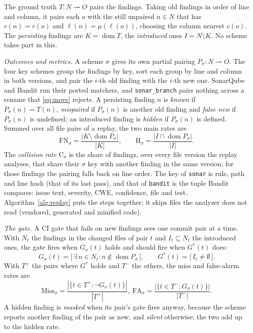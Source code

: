 \documentclass[conference]{IEEEtran}
\begin{document}
The ground truth $T\colon N \rightharpoonup O$ pairs the findings. Taking old findings in
order of line and column, it pairs each $o$ with the still unpaired $n \in N$ that has
$r(n) = r(o)$ and $\ell(n) = \mu(\ell(o))$, choosing the column nearest $c(o)$. The
\emph{persisting} findings are $K = \operatorname{dom} T$, the \emph{introduced} ones
$I = N \setminus K$. No scheme takes part in this.

\textit{Outcomes and metrics.} A scheme $\sigma$ gives its own partial pairing
$P_\sigma\colon N \rightharpoonup O$. The four key schemes group the findings by key,
sort each group by line and column in both versions, and pair the $i$-th old finding with
the $i$-th new one. SonarQube and Bandit run their ported matchers, and
\texttt{sonar\_branch} pairs nothing across a rename that \eqref{eq:move} rejects. A
persisting finding $n$ is \emph{known} if $P_\sigma(n) = T(n)$, \emph{mispaired} if
$P_\sigma(n)$ is another old finding and \emph{false new} if $P_\sigma(n)$ is undefined;
an introduced finding is \emph{hidden} if $P_\sigma(n)$ is defined. Summed over all file
pairs of a replay, the two main rates are
\begin{equation}\label{eq:rates}
\mathrm{FN}_\sigma = \frac{|K \setminus \operatorname{dom} P_\sigma|}{|K|},
\qquad
\mathrm{H}_\sigma = \frac{|I \cap \operatorname{dom} P_\sigma|}{|I|}.
\end{equation}
The \emph{collision rate} $\mathrm{C}_\sigma$ is the share of findings, over every file
version the replay analyses, that share their $\sigma$ key with another finding in the
same version; for those findings the pairing falls back on line order. The key of
\texttt{sonar} is rule, path and line hash (that of its last pass), and that of
\texttt{bandit} is the tuple Bandit compares: issue text, severity, CWE, confidence,
file and test. Algorithm~\ref{alg:replay} puts the steps together; it skips files the
analyzer does not read (vendored, generated and minified code).

\textit{The gate.} A CI gate that fails on new findings sees one commit pair at a time.
With $N_t$ the findings in the changed files of pair $t$ and $I_t \subseteq N_t$ the
introduced ones, the gate fires when $G_\sigma(t)$ holds and should fire when $G^*(t)$
does:
\begin{equation}\label{eq:gate}
G_\sigma(t) = \bigl[\, \exists\, n \in N_t : n \notin \operatorname{dom} P_\sigma \,\bigr],
\qquad
G^{*}(t) = \bigl[\, I_t \neq \emptyset \,\bigr].
\end{equation}
With $T^{+}$ the pairs where $G^{*}$ holds and $T^{-}$ the others, the miss and
false-alarm rates are
\begin{equation}\label{eq:gaterates}
\mathrm{Miss}_\sigma = \frac{|\{t \in T^{+} : \neg G_\sigma(t)\}|}{|T^{+}|},
\
\mathrm{FA}_\sigma = \frac{|\{t \in T^{-} : G_\sigma(t)\}|}{|T^{-}|}.
\end{equation}
A hidden finding is \emph{masked} when its pair's gate fires anyway, because the scheme
reports another finding of the pair as new, and \emph{silent} otherwise; the two add up
to the hidden rate.
\end{document}
